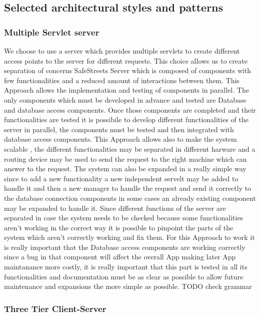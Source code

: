 \subsection{Selected architectural styles and patterns}
\subsubsection{Multiple Servlet server}
We choose to use a server which provides multiple servlets to create different access points to the server for different requests. This choice allows us to create separation of concerns SafeStreets Server which is composed of components with few functionalities and a reduced amount of interactions between them. This Approach allows the implementation and testing of components in parallel. The only components which must be developed in advance and tested are Database and database access components. Once those components  are completed  and their functionalities are tested it is possibile to develop different functionalities of the server in parallel, the components must be tested and then integrated with database access components. This Approach allows also to make the system scalable , the different functionalities may be separated in different harware and a routing device may be used to send the request to the right machine which can answer to the request. The system can also be expanded in a really simple way since to add a new functionality a new independent servelt may be added to handle it and then a new manager to handle the request and send it correctly to the database connection components in some cases an  already existing component may be expanded to handle it.
Since different functions of the server are separated in case the system needs to be checked because some functionalities aren't working in the correct way it is possible to pinpoint the parts of the system which aren't correctly working and fix them. For this Approach to work it is really important that the Database access components are working correctly since a bug in that component will affect the overall App making later App maintanance more costly, it is really important that this part is tested in all its functionalities and documentation must be as clear as possible to allow future maintenance and expansions the more simple as possible.
TODO check grammar

\subsubsection{Three Tier Client-Server}

